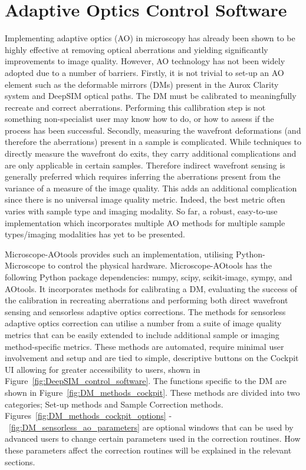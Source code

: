 \chapter{Adaptive Optics Control Software}
\label{chpt:ao_tools}

Implementing adaptive optics (AO) in microscopy has already been shown to be highly effective at removing optical aberrations and yielding significantly improvements to image quality\cite{booth2014adaptive,girkin2009adaptive}. However, AO technology has not been widely adopted due to a number of barriers. Firstly, it is not trivial to set-up an AO element such as the deformable mirrors (DMs) present in the Aurox Clarity system and DeepSIM optical paths. The DM must be calibrated to meaningfully recreate and correct aberrations. Performing this callibration step is not something non-specialist user may know how to do, or how to assess if the process has been successful. Secondly, measuring the wavefront deformations (and therefore the aberrations) present in a sample is complicated. While techniques to directly measure the  wavefront do exits, they carry additional complications and are only applicable in certain samples\cite{wang2014rapid,wang2015direct}. Therefore indirect wavefront sensing is generally preferred which requires inferring the aberrations present from the variance of a measure of the image quality\cite{rodriguez2018adaptive}. This adds an additional complication since there is no universal image quality metric. Indeed, the best metric often varies with sample type and imaging modality\cite{burke2015adaptive,booth2002adaptive,fienup2003aberration,debarre2008adaptive}. So far, a robust, easy-to-use implementation which incorporates multiple AO methods for multiple sample types/imaging modalities has yet to be presented\cite{ji2017adaptive}.

Microscope-AOtools provides such an implementation, utilising 
Python-Microscope to control the physical hardware. Microscope-AOtools
has the following Python package dependencies: numpy\cite{walt2011numpy},
scipy\cite{virtanen2020scipy}, scikit-image\cite{van2014scikit}, 
sympy\cite{meurer2017sympy}, and AOtools\cite{townson2019aotools}.
It incorporates methods for calibrating a DM, evaluating the success of the calibration in recreating aberrations and performing both direct wavefront sensing and sensorless adaptive optics corrections. The methods for sensorless adaptive optics correction can utilise a number from a suite of image quality metrics that can be easily extended to include additional sample or imaging method-specific metrics. These methods are automated, require minimal user involvement and setup and are tied to simple, descriptive  buttons on the Cockpit UI allowing for greater accessibility to users, shown in Figure~\ref{fig:DeepSIM_control_software}. The functions specific to the DM are shown in Figure~\ref{fig:DM_methods_cockpit}. These methods are divided into two categories; Set-up methods and Sample Correction methods. Figures~\ref{fig:DM_methods_cockpit_options} -~\ref{fig:DM_sensorless_ao_parameters} are optional windows that can be used by advanced users to change certain parameters used in the correction routines. How these parameters affect the correction routines will be explained in the relevant sections.

